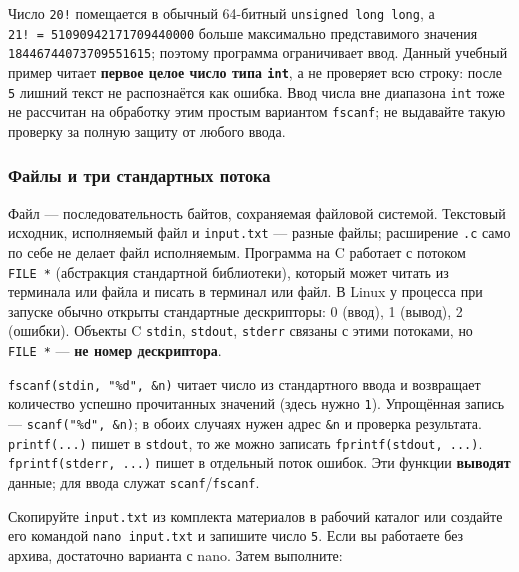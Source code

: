 Число \texttt{20!} помещается в обычный 64-битный
\texttt{unsigned\ long\ long}, а \texttt{21!\ =\ 51090942171709440000}
больше максимально представимого значения \texttt{18446744073709551615};
поэтому программа ограничивает ввод. Данный учебный пример читает
\textbf{первое целое число типа \texttt{int}}, а не проверяет всю
строку: после \texttt{5} лишний текст не распознаётся как ошибка. Ввод
числа вне диапазона \texttt{int} тоже не рассчитан на обработку этим
простым вариантом \texttt{fscanf}; не выдавайте такую проверку за полную
защиту от любого ввода.

\hypertarget{ux444ux430ux439ux43bux44b-ux438-ux442ux440ux438-ux441ux442ux430ux43dux434ux430ux440ux442ux43dux44bux445-ux43fux43eux442ux43eux43aux430}{%
\subsubsection{Файлы и три стандартных
потока}\label{ux444ux430ux439ux43bux44b-ux438-ux442ux440ux438-ux441ux442ux430ux43dux434ux430ux440ux442ux43dux44bux445-ux43fux43eux442ux43eux43aux430}}

Файл --- последовательность байтов, сохраняемая файловой системой.
Текстовый исходник, исполняемый файл и \texttt{input.txt} --- разные
файлы; расширение \texttt{.c} само по себе не делает файл исполняемым.
Программа на C работает с потоком \texttt{FILE\ *} (абстракция
стандартной библиотеки), который может читать из терминала или файла и
писать в терминал или файл. В Linux у процесса при запуске обычно
открыты стандартные дескрипторы: 0 (ввод), 1 (вывод), 2 (ошибки).
Объекты C \texttt{stdin}, \texttt{stdout}, \texttt{stderr} связаны с
этими потоками, но \texttt{FILE\ *} --- \textbf{не номер дескриптора}.

\texttt{fscanf(stdin,\ "\%d",\ \&n)} читает число из стандартного ввода
и возвращает количество успешно прочитанных значений (здесь нужно
\texttt{1}). Упрощённая запись --- \texttt{scanf("\%d",\ \&n)}; в обоих
случаях нужен адрес \texttt{\&n} и проверка результата.
\texttt{printf(...)} пишет в \texttt{stdout}, то же можно записать
\texttt{fprintf(stdout,\ ...)}. \texttt{fprintf(stderr,\ ...)} пишет в
отдельный поток ошибок. Эти функции \textbf{выводят} данные; для ввода
служат \texttt{scanf}/\texttt{fscanf}.

Скопируйте \texttt{input.txt} из комплекта материалов в рабочий каталог
или создайте его командой \texttt{nano\ input.txt} и запишите число
\texttt{5}. Если вы работаете без архива, достаточно варианта с nano.
Затем выполните:

